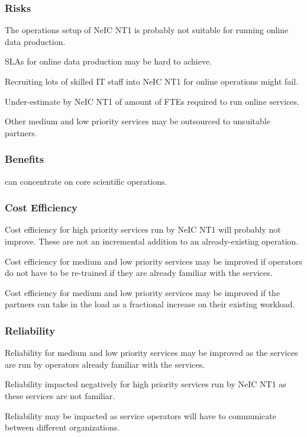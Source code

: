 \documentclass[12pt,a4paper]{article}
\newcommand{\nnt}{NeIC NT1\xspace}
\begin{document}
\subsubsection*{Risks}
\bitm
  \item The operations setup of NeIC NT1 is probably not suitable for running online data production.
  \item SLAs for online data production may be hard to achieve.
  \item Recruiting lots of skilled IT staff into \nnt for online operations might fail.
  \item Under-estimate by \nnt of amount of FTEs required to run online services.
  \item Other medium and low priority services may be outsourced to unsuitable partners.
\eitm

\subsubsection*{Benefits}
\bitm
\item \EC can concentrate on core scientific operations.
\eitm

\subsubsection*{Cost Efficiency}
\bitm
\item Cost efficiency for high priority services run by \nnt will probably not improve.
  These are not an incremental addition to an already-existing operation.
  \item Cost efficiency for medium and low priority services may be improved if operators do not have to be re-trained if they are already familiar with the services.
  \item Cost efficiency for medium and low priority services may be improved if the partners can take in the \ED load as a fractional increase on their existing workload.
\eitm

\subsubsection*{Reliability}
\bitm
  \item Reliability for medium and low priority services may be improved as the services are run by operators already familiar with the services.
  \item Reliability impacted negatively for high priority services run by \nnt as these services are not familiar.
  \item {Reliability may be impacted as service operators will have to communicate between different organizations.}
\eitm
\end{document}
